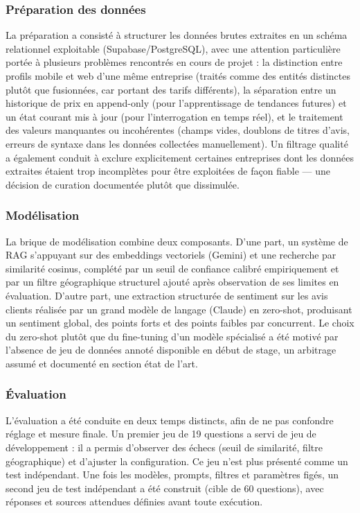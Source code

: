 \subsubsection{Préparation des données}

La préparation a consisté à structurer les données brutes extraites en un schéma relationnel exploitable
(Supabase/PostgreSQL), avec une attention particulière portée à plusieurs problèmes rencontrés en cours de
projet : la distinction entre profils mobile et web d'une même entreprise (traités comme des entités
distinctes plutôt que fusionnées, car portant des tarifs différents), la séparation entre un historique de
prix en append-only (pour l'apprentissage de tendances futures) et un état courant mis à jour (pour
l'interrogation en temps réel), et le traitement des valeurs manquantes ou incohérentes (champs vides,
doublons de titres d'avis, erreurs de syntaxe dans les données collectées manuellement). Un filtrage qualité
a également conduit à exclure explicitement certaines entreprises dont les données extraites étaient trop
incomplètes pour être exploitées de façon fiable --- une décision de curation documentée plutôt que
dissimulée.

\subsubsection{Modélisation}

La brique de modélisation combine deux composants. D'une part, un système de RAG s'appuyant sur des
embeddings vectoriels (Gemini) et une recherche par similarité cosinus, complété par un seuil de confiance
calibré empiriquement et par un filtre géographique structurel ajouté après observation de ses limites en
évaluation. D'autre part, une extraction structurée de sentiment sur les avis clients réalisée par un grand
modèle de langage (Claude) en zero-shot, produisant un sentiment global, des points forts et des points
faibles par concurrent. Le choix du zero-shot plutôt que du fine-tuning d'un modèle spécialisé a été motivé
par l'absence de jeu de données annoté disponible en début de stage, un arbitrage assumé et documenté en
section état de l'art.

\subsubsection{Évaluation}

L'évaluation a été conduite en deux temps distincts, afin de ne pas confondre réglage et mesure finale.
Un premier jeu de 19 questions a servi de jeu de développement : il a permis d'observer des échecs
(seuil de similarité, filtre géographique) et d'ajuster la configuration. Ce jeu n'est plus présenté comme
un test indépendant. Une fois les modèles, prompts, filtres et paramètres figés, un second jeu de test
indépendant a été construit (cible de 60 questions), avec réponses et sources attendues définies avant
toute exécution.

